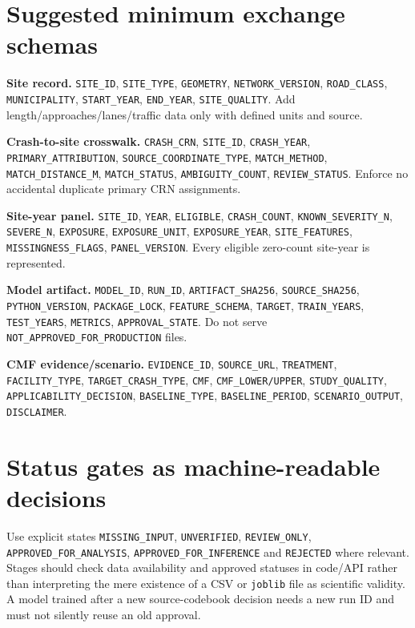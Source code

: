 \documentclass[11pt,a4paper,openany]{report}
\newcommand{\pathcode}[1]{\nolinkurl{#1}}
\begin{document}
\section{Suggested minimum exchange schemas}
\textbf{Site record.} \pathcode{SITE_ID}, \pathcode{SITE_TYPE}, \pathcode{GEOMETRY}, \pathcode{NETWORK_VERSION}, \pathcode{ROAD_CLASS}, \pathcode{MUNICIPALITY}, \pathcode{START_YEAR}, \pathcode{END_YEAR}, \pathcode{SITE_QUALITY}. Add length/approaches/lanes/traffic data only with defined units and source.

\textbf{Crash-to-site crosswalk.} \pathcode{CRASH_CRN}, \pathcode{SITE_ID}, \pathcode{CRASH_YEAR}, \pathcode{PRIMARY_ATTRIBUTION}, \pathcode{SOURCE_COORDINATE_TYPE}, \pathcode{MATCH_METHOD}, \pathcode{MATCH_DISTANCE_M}, \pathcode{MATCH_STATUS}, \pathcode{AMBIGUITY_COUNT}, \pathcode{REVIEW_STATUS}. Enforce no accidental duplicate primary CRN assignments.

\textbf{Site-year panel.} \pathcode{SITE_ID}, \pathcode{YEAR}, \pathcode{ELIGIBLE}, \pathcode{CRASH_COUNT}, \pathcode{KNOWN_SEVERITY_N}, \pathcode{SEVERE_N}, \pathcode{EXPOSURE}, \pathcode{EXPOSURE_UNIT}, \pathcode{EXPOSURE_YEAR}, \pathcode{SITE_FEATURES}, \pathcode{MISSINGNESS_FLAGS}, \pathcode{PANEL_VERSION}. Every eligible zero-count site-year is represented.

\textbf{Model artifact.} \pathcode{MODEL_ID}, \pathcode{RUN_ID}, \pathcode{ARTIFACT_SHA256}, \pathcode{SOURCE_SHA256}, \pathcode{PYTHON_VERSION}, \pathcode{PACKAGE_LOCK}, \pathcode{FEATURE_SCHEMA}, \pathcode{TARGET}, \pathcode{TRAIN_YEARS}, \pathcode{TEST_YEARS}, \pathcode{METRICS}, \pathcode{APPROVAL_STATE}. Do not serve \pathcode{NOT_APPROVED_FOR_PRODUCTION} files.

\textbf{CMF evidence/scenario.} \pathcode{EVIDENCE_ID}, \pathcode{SOURCE_URL}, \pathcode{TREATMENT}, \pathcode{FACILITY_TYPE}, \pathcode{TARGET_CRASH_TYPE}, \pathcode{CMF}, \texttt{CMF\_LOWER/UPPER}, \pathcode{STUDY_QUALITY}, \pathcode{APPLICABILITY_DECISION}, \pathcode{BASELINE_TYPE}, \pathcode{BASELINE_PERIOD}, \pathcode{SCENARIO_OUTPUT}, \pathcode{DISCLAIMER}.

\section{Status gates as machine-readable decisions}
Use explicit states \pathcode{MISSING_INPUT}, \pathcode{UNVERIFIED}, \pathcode{REVIEW_ONLY}, \pathcode{APPROVED_FOR_ANALYSIS}, \pathcode{APPROVED_FOR_INFERENCE} and \pathcode{REJECTED} where relevant. Stages should check data availability and approved statuses in code/API rather than interpreting the mere existence of a CSV or \pathcode{joblib} file as scientific validity. A model trained after a new source-codebook decision needs a new run ID and must not silently reuse an old approval.
\end{document}

